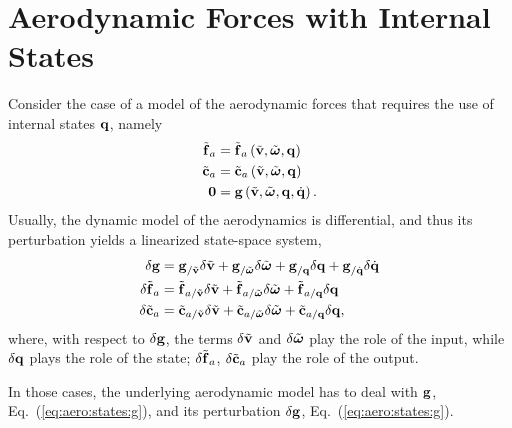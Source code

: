 \section{Aerodynamic Forces with Internal States}
Consider the case of a model of the aerodynamic forces
that requires the use of internal states $\bm{\mathbf{q}}$, namely
\begin{subequations}
\begin{align}
	\tilde{\bm{\mathbf{f}}}_a
	&=
	\tilde{\bm{\mathbf{f}}}_a\left( \tilde{\bm{\mathbf{v}}},\tilde{\bm{\mathbf{\omega}}},\bm{\mathbf{q}} \right)
	\\
	\tilde{\bm{\mathbf{c}}}_a
	&=
	\tilde{\bm{\mathbf{c}}}_a\left( \tilde{\bm{\mathbf{v}}},\tilde{\bm{\mathbf{\omega}}},\bm{\mathbf{q}} \right)
	\\
	\bm{\mathbf{0}}
	&=
	\bm{\mathbf{g}}\left( \tilde{\bm{\mathbf{v}}},\tilde{\bm{\mathbf{\omega}}},\bm{\mathbf{q}}, \dot{\bm{\mathbf{q}}} \right)
	\label{eq:aero:states:g}
	.
\end{align}
\end{subequations}
Usually, the dynamic model of the aerodynamics is differential,
and thus its perturbation yields a linearized state-space system,
\begin{subequations}
\begin{align}
	\delta\bm{\mathbf{g}}
	&=
	\bm{\mathbf{g}}_{/\tilde{\bm{\mathbf{v}}}} \delta\tilde{\bm{\mathbf{v}}}
	+ \bm{\mathbf{g}}_{/\tilde{\bm{\mathbf{\omega}}}} \delta\tilde{\bm{\mathbf{\omega}}}
	+ \bm{\mathbf{g}}_{/\bm{\mathbf{q}}} \delta\bm{\mathbf{q}}
	+ \bm{\mathbf{g}}_{/\dot{\bm{\mathbf{q}}}} \delta\dot{\bm{\mathbf{q}}}
	\label{eq:aero:states:delta-g}
	\\
	\delta \tilde{\bm{\mathbf{f}}}_a
	&=
	\tilde{\bm{\mathbf{f}}}_{a/\tilde{\bm{\mathbf{v}}}} \delta\tilde{\bm{\mathbf{v}}}
	+ \tilde{\bm{\mathbf{f}}}_{a/\tilde{\bm{\mathbf{\omega}}}} \delta\tilde{\bm{\mathbf{\omega}}}
	+ \tilde{\bm{\mathbf{f}}}_{a/\bm{\mathbf{q}}} \delta\bm{\mathbf{q}}
	\label{eq:aero:states:delta-f}
	\\
	\delta \tilde{\bm{\mathbf{c}}}_a
	&=
	\tilde{\bm{\mathbf{c}}}_{a/\tilde{\bm{\mathbf{v}}}} \delta\tilde{\bm{\mathbf{v}}}
	+ \tilde{\bm{\mathbf{c}}}_{a/\tilde{\bm{\mathbf{\omega}}}} \delta\tilde{\bm{\mathbf{\omega}}}
	+ \tilde{\bm{\mathbf{c}}}_{a/\bm{\mathbf{q}}} \delta\bm{\mathbf{q}}
	\label{eq:aero:states:delta-c}
	,
\end{align}
\end{subequations}
where, with respect to $\delta\bm{\mathbf{g}}$, the terms $\delta\tilde{\bm{\mathbf{v}}}$
and $\delta\tilde{\bm{\mathbf{\omega}}}$ play the role of the input, while $\delta\bm{\mathbf{q}}$
plays the role of the state;
$\delta\tilde{\bm{\mathbf{f}}}_a$, $\delta\tilde{\bm{\mathbf{c}}}_a$ play the role of the output.

In those cases, the underlying aerodynamic model has
to deal with $\bm{\mathbf{g}}$, Eq.~(\ref{eq:aero:states:g}),
and its perturbation $\delta\bm{\mathbf{g}}$, Eq.~(\ref{eq:aero:states:g}).

